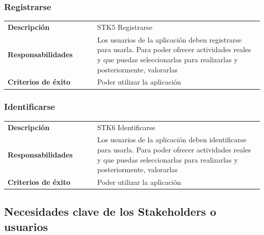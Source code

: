 \documentclass[11pt]{article}
\begin{document}
\subsubsection{Registrarse}
\begin{table}[H]
  \centering
  \begin{tabular}{p{0.35\linewidth}|p{0.65\linewidth}}
    \toprule
    \textbf{Descripción} & STK5 Registrarse\\
    \textbf{Responsabilidades} & Los usuarios de la aplicación deben registrarse para usarla. Para poder ofrecer actividades reales y que puedas seleccionarlas para realizarlas y posteriormente, valorarlas\\
    \textbf{Criterios de éxito} &  Poder utilizar la aplicación\\
    \bottomrule
  \end{tabular}
\end{table}

\subsubsection{Identificarse}
\begin{table}[H]
  \centering
  \begin{tabular}{p{0.35\linewidth}|p{0.65\linewidth}}
    \toprule
    \textbf{Descripción} & STK6 Identificarse\\
    \textbf{Responsabilidades} & Los usuarios de la aplicación deben identificarse para usarla. Para poder ofrecer actividades reales y que puedas seleccionarlas para realizarlas y posteriormente, valorarlas\\
    \textbf{Criterios de éxito} & Poder utilizar la aplicación \\
    \bottomrule
  \end{tabular}
\end{table}

\subsection{Necesidades clave de los Stakeholders o usuarios}
          
\end{document}
